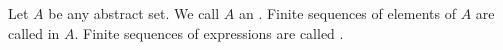 Let $A$ be any abstract set. We call $A$ an . Finite sequences of elements of $A$ are called  in $A$. Finite sequences of expressions are called .
